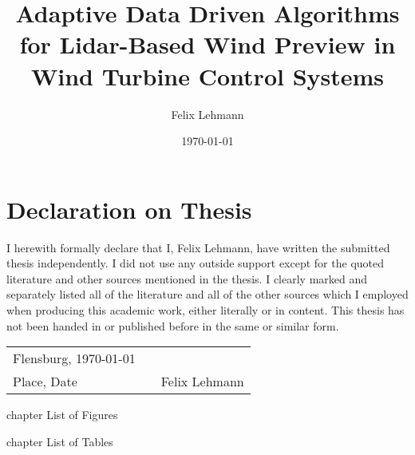 \documentclass[a4paper, 12pt, bibtotoc, toc=chapterentrywithdots, hyphens, numbers=noenddot]{scrreprt}
\title{Adaptive Data Driven Algorithms for Lidar-Based Wind Preview in Wind Turbine Control Systems}
\author{Felix Lehmann}
\date{\today}
\begin{document}
\pagestyle{empty}



\chapter*{Declaration on Thesis}
\thispagestyle{Preamble}

I herewith formally declare that I, Felix Lehmann, have written the submitted thesis independently. I did not use any outside support except for the quoted literature and other sources mentioned in the thesis. I clearly marked and separately listed all of the literature and all of the other sources which I employed when producing this academic work, either literally or in content. This thesis has not been handed in or published before in the same or similar form.

\vspace{4cm}

\begin{tabular}[h]{l p{2cm} p{7cm}}
Flensburg, \today &  & \\
\cline{1-1}\cline{3-3}
{\small Place, Date}& & {\small Felix Lehmann}\\
\end{tabular}


\newpage
{}
\tableofcontents
\thispagestyle{Preamble}

\newpage
\listoffigures
\thispagestyle{Preamble}
 {chapter} {List of Figures}

\newpage
\listoftables
\thispagestyle{Preamble}
 {chapter} {List of Tables}

\newpage
\thispagestyle{Preamble}
\printglossary[type=\acronymtype,title={List of Abbreviations}, style=long]
\end{document}
